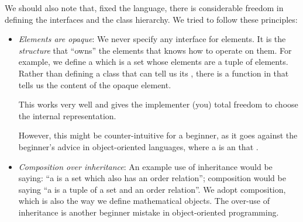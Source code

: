 We should also note that, fixed the language, there is considerable freedom in defining the interfaces and the class hierarchy.
We tried to follow these principles:
\begin{itemize}
    \item \emph{Elements are opaque}: We never specify any interface for elements.
          It is the \emph{structure} that ``owns'' the elements that knows how to operate on them.
          For example, we define a  which is a set whose elements are a tuple of elements.
          Rather than defining a class  that can tell us its , there is a function  in  that tells us the content of the opaque element.

          This works very well and gives the implementer (you) total freedom to choose the internal representation.

          However, this might be counter-intuitive for a beginner, as it goes against the beginner's advice in object-oriented languages, where a  is an  that .

    \item \emph{Composition over inheritance}: An example use of inheritance would be saying: ``a  is a set which also has an order relation''; composition would be saying ``a  is a tuple of a set and an order relation''.
          We adopt composition, which is also the way we define mathematical objects.
          The over-use of inheritance is another beginner mistake in object-oriented programming.
\end{itemize}
